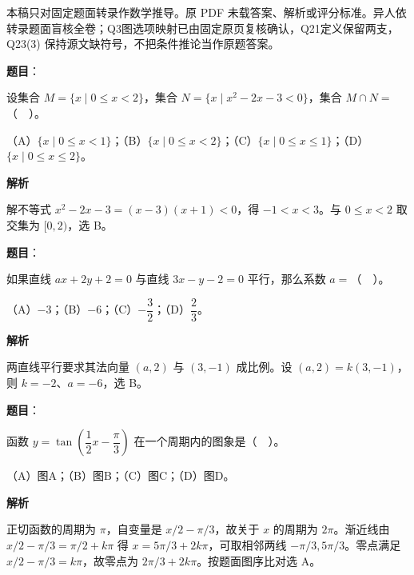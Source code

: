 

本稿只对固定题面转录作数学推导。原 PDF 未载答案、解析或评分标准。异人依转录题面盲核全卷；Q3图选项映射已由固定原页复核确认，Q21定义保留两支，Q23(3) 保持源文缺符号，不把条件推论当作原题答案。


\begin{answer}

\textbf{题目}：

设集合 $M=\{x\mid0\le x<2\}$，集合 $N=\{x\mid x^2-2x-3<0\}$，集合 $M\cap N=$（　）。

（A）$\{x\mid0\le x<1\}$；（B）$\{x\mid0\le x<2\}$；（C）$\{x\mid0\le x\le1\}$；（D）$\{x\mid0\le x\le2\}$。

\textbf{解析}

解不等式 $x^2-2x-3=(x-3)(x+1)<0$，得 $-1<x<3$。与 $0\le x<2$ 取交集为 $[0,2)$，选 B。


\end{answer}
\begin{answer}

\textbf{题目}：

如果直线 $ax+2y+2=0$ 与直线 $3x-y-2=0$ 平行，那么系数 $a=$（　）。

（A）$-3$；（B）$-6$；（C）$-\dfrac32$；（D）$\dfrac23$。

\textbf{解析}

两直线平行要求其法向量 $(a,2)$ 与 $(3,-1)$ 成比例。设 $(a,2)=k(3,-1)$，则 $k=-2$、$a=-6$，选 B。


\end{answer}
\begin{answer}

\textbf{题目}：

函数 $y=\tan\left(\dfrac12x-\dfrac\pi3\right)$ 在一个周期内的图象是（　）。

（A）图A；（B）图B；（C）图C；（D）图D。
\nopagebreak[4]
\begin{center}\end{center}
\nopagebreak[4]
\textbf{解析}

正切函数的周期为 $\pi$，自变量是 $x/2-\pi/3$，故关于 $x$ 的周期为 $2\pi$。渐近线由 $x/2-\pi/3=\pi/2+k\pi$ 得 $x=5\pi/3+2k\pi$，可取相邻两线 $-\pi/3,5\pi/3$。零点满足 $x/2-\pi/3=k\pi$，故零点为 $2\pi/3+2k\pi$。按题面图序比对选 A。


\end{answer}
